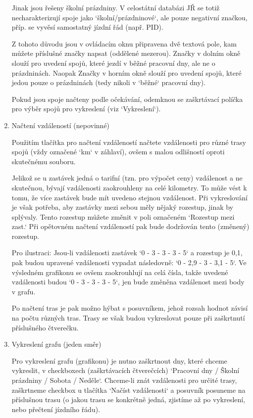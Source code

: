 \documentclass[14pt]{article}
\begin{document}
\begin{enumerate}
Jinak jsou řešeny školní prázdniny. V celostátní databázi JŘ se totiž necharakterizují spoje jako `školní/prázdninové`, ale pouze negativní značkou, příp. se vyvěsí samostatný jízdní řád (např. PID).

Z tohoto důvodu jsou v ovládacím oknu připravena dvě textová pole, kam můžete příslušné značky napsat (oddělené mezerou). Značky v dolním okně slouží pro uvedení spojů, které jezdí v běžné pracovní dny, ale ne o prázdninách.
Naopak Značky v horním okně slouží pro uvedení spojů, které jedou pouze o prázdninách (tedy nikoli v `běžné` pracovní dny).

Pokud jsou spoje načteny podle očekávání, odemknou se zaškrtávací políčka pro výběr spojů pro vykreslení (viz `Vykreslení`).

\item Načtení vzdáleností (nepovinné)

Použitím tlačítka pro načtení vzdáleností načtete vzdálenosti pro různé trasy spojů (vždy označené `km` v záhlaví), ovšem s malou odlišností oproti skutečnému souboru.

Jelikož se u zastávek jedná o tarifní (tzn. pro výpočet ceny) vzdálenost a ne skutečnou, bývají vzdálenosti zaokrouhleny na celé kilometry. To může vést k tomu, že více zastávek bude mít uvedeno stejnou vzdálenost. 
Při vykreslování je však potřeba, aby zastávky mezi sebou měly nějaký rozestup, jinak by splývaly. Tento rozestup můžete změnit v poli označeném `Rozestup mezi zast.` Při opětovném načtení vzdáleností pak bude dodržován tento (změnený) rozestup.

Pro ilustraci: Jsou-li vzdálenosti zastávek `0 - 3 - 3 - 3 - 5` a rozestup je 0,1, pak budou upravené vzdálenosti vypadat následovně: `0 - 2,9 - 3 - 3,1 - 5`. Ve výsledném grafikonu se ovšem zaokrouhlují na celá čísla, takže uvedené vzdálenosti budou `0 - 3 - 3 - 3 - 5`, jen bude změněna vzdálenost mezi body v grafu.

Po načtení tras je pak možno hýbat s posuvníkem, jehož rozsah hodnot závisí na počtu různých tras. Trasy se však budou vykreslovat pouze při zaškrtnutí příslušného čtverečku.

\item Vykreslení grafu (jeden směr)

Pro vykreslení grafu (grafikonu) je nutno zaškrtnout dny, které chceme vykreslit, v checkboxech (zaškrtávacích čtverečcích) `Pracovní dny / Školní prázdniny / Sobota / Neděle`. Chceme-li znát vzdálenosti pro určité trasy, zaškrtneme checkbox u tlačítka `Načíst vzdálenosti` a posuvník posuneme na příslušnou trasu 
(o jakou trasu se konkrétně jedná, zjistíme až po vykreslení, nebo přečtení jízdního řádu).


\end{enumerate}
\end{document}
